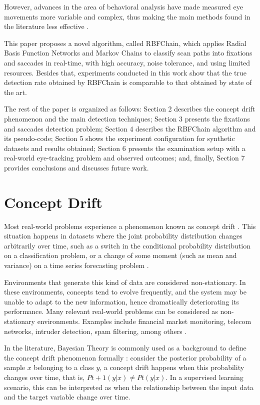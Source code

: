 \documentclass[preprint,12pt]{elsarticle}
\begin{document}
However, advances in the area of behavioral analysis have made measured eye movements more variable and complex, thus making the main methods found in the literature less effective \cite{Anderson:OneAlgorithmToRuleThemAll:2017}.

This paper proposes a novel algorithm, called RBFChain, which applies Radial Basis Function Networks and Markov Chains to classify scan paths into fixations and saccades in real-time, with high accuracy, noise tolerance, and using limited resources.
Besides that, experiments conducted in this work show that the true detection rate obtained by RBFChain is comparable to that obtained by state of the art.

The rest of the paper is organized as follows:
Section 2 describes the concept drift phenomenon and the main detection techniques;
Section 3 presents the fixations and saccades detection problem;
Section 4 describes the RBFChain algorithm and its pseudo-code;
Section 5 shows the experiment configuration for synthetic datasets  and results obtained;
Section 6 presents the examination setup with a real-world eye-tracking problem and observed outcomes; and, finally, Section 7 provides conclusions
and discusses future work.

\section{Concept Drift}
\label{sec:concept_drift}

Most real-world problems experience a phenomenon known as
concept drift \cite{Gama:2014:DAF:2670967.2670971}.
This situation happens in datasets where the
joint probability distribution changes arbitrarily over time, such as a switch in the conditional probability distribution on a classification problem, or a change of some moment (such as mean and variance) on a time series forecasting problem \cite{tsymbal2004problem}.

Environments that generate this kind of data are considered non-stationary.
In these environments, concepts tend to evolve frequently, and the system may be unable to adapt to the new information, hence dramatically deteriorating its performance.
%
Many relevant real-world problems can be considered as non-stationary environments.
Examples include financial market monitoring, telecom networks, intruder detection, spam filtering, among others \cite{Gama:2014:DAF:2670967.2670971}.

In the literature, Bayesian Theory is commonly used as a background to define the concept drift phenomenon formally \cite{Elwell:2011}: consider the posterior probability of a sample $x$ belonging to a class $y$, a concept drift happens when this probability changes over time, that is, $Pt + 1 (y | x) \neq Pt (y | x)$. In a supervised learning scenario, this can be interpreted as when the relationship between the input data and the target variable change over time.
\end{document}
